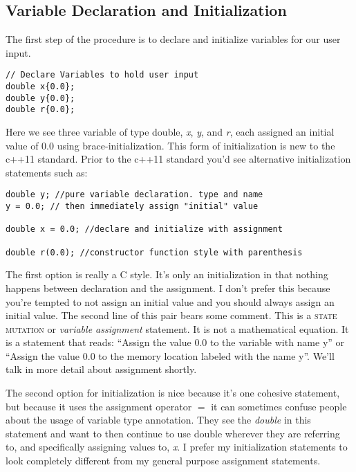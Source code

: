 \documentclass[]{tufte-handout}
\begin{document}
\subsection{Variable Declaration and Initialization}

The first step of the procedure is to declare and initialize variables for our user input. 
\begin{verbatim}
// Declare Variables to hold user input
double x{0.0};
double y{0.0};
double r{0.0};
\end{verbatim}

Here we see three variable of type double, \textit{x}, \textit{y}, and \textit{r}, each assigned an initial value of $0.0$ using brace-initialization. This form of initialization is new to the c++11 standard. Prior to the c++11 standard you'd see alternative initialization statements such as:
\begin{verbatim}
double y; //pure variable declaration. type and name
y = 0.0; // then immediately assign "initial" value

double x = 0.0; //declare and initialize with assignment

double r(0.0); //constructor function style with parenthesis
\end{verbatim}

The first option is really a C style. It's only an initialization in that nothing happens between declaration and the assignment. I don't prefer this because you're tempted to not assign an initial value and you should always assign an initial value. The second line of this pair bears some comment. This is a \textsc{state mutation} or \textit{variable assignment} statement. It is not a mathematical equation. It is a statement that reads: ``Assign the value 0.0 to the variable with name y'' or ``Assign the value 0.0 to the memory location labeled with the name y''. We'll talk in more detail about assignment shortly.

The second option for initialization is nice because it's one cohesive statement, but because it uses the assignment operator $=$ it can sometimes confuse people about the usage of variable type annotation. They see the \textit{double} in this statement and want to then continue to use double wherever they are referring to, and specifically assigning values to, \textit{x}.  I prefer my initialization statements to look completely different from my general purpose assignment statements.
\end{document}
